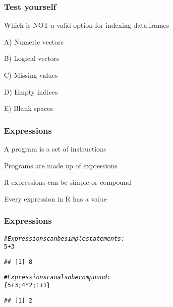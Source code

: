 \documentclass[12pt]{beamer}\usepackage[]{graphicx}\usepackage[]{color}
\makeatletter
\newcommand{\hlnum}[1]{\textcolor[rgb]{0.686,0.059,0.569}{#1}}%
\newcommand{\hlcom}[1]{\textcolor[rgb]{0.678,0.584,0.686}{\textit{#1}}}%
\newcommand{\hlopt}[1]{\textcolor[rgb]{0,0,0}{#1}}%
\newcommand{\hlstd}[1]{\textcolor[rgb]{0.345,0.345,0.345}{#1}}%
\newenvironment{kframe}{%
 \def\at@end@of@kframe{}%
 \ifinner\ifhmode%
  \def\at@end@of@kframe{\end{minipage}}%
  \begin{minipage}{\columnwidth}%
 \fi\fi%
 \def\FrameCommand##1{\hskip\@totalleftmargin \hskip-\fboxsep
 \colorbox{shadecolor}{##1}\hskip-\fboxsep
     \hskip-\linewidth \hskip-\@totalleftmargin \hskip\columnwidth}%
 \MakeFramed {\advance\hsize-\width
   \@totalleftmargin\z@ \linewidth\hsize
   \@setminipage}}%
 {\par\unskip\endMakeFramed%
 \at@end@of@kframe}
\newenvironment{knitrout}{}{} %
\makeatother
\begin{document}

\begin{frame}[fragile]
\frametitle{Test yourself}

Which is NOT a valid option for indexing data.frames
\bbi
  \item[A)] Numeric vectors
  \item[B)] Logical vectors
  \item[C)] Missing values
  \item[D)] Empty indices
  \item[E)] Blank spaces
\ei

\end{frame}


\begin{frame}[fragile]
\frametitle{Expressions}

\bbi
  \item A program is a set of instructions
  \item Programs are made up of expressions
  \item R expressions can be simple or compound
  \item Every expression in R has a value
\ei

\end{frame}


\begin{frame}[fragile]
\frametitle{Expressions}

\begin{knitrout}\footnotesize
{}\color{fgcolor}\begin{kframe}
\begin{alltt}
\hlcom{# Expressions can be simple statements:}
\hlnum{5} \hlopt{+} \hlnum{3}
\end{alltt}
\begin{verbatim}
## [1] 8
\end{verbatim}
\end{kframe}
\end{knitrout}

\begin{knitrout}\footnotesize
{}\color{fgcolor}\begin{kframe}
\begin{alltt}
\hlcom{# Expressions can also be compound:}
\hlstd{\{}\hlnum{5} \hlopt{+} \hlnum{3}\hlstd{;} \hlnum{4} \hlopt{*} \hlnum{2}\hlstd{;} \hlnum{1} \hlopt{+} \hlnum{1}\hlstd{\}}
\end{alltt}
\begin{verbatim}
## [1] 2
\end{verbatim}
\end{kframe}
\end{knitrout}

\end{frame}
\end{document}

